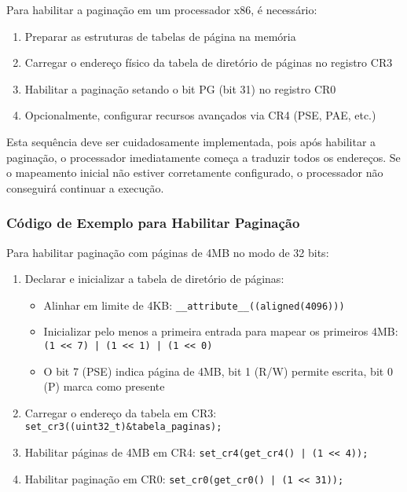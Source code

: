 Para habilitar a paginação em um processador x86, é necessário:

\begin{enumerate}
    \item Preparar as estruturas de tabelas de página na memória
    \item Carregar o endereço físico da tabela de diretório de páginas no registro CR3
    \item Habilitar a paginação setando o bit PG (bit 31) no registro CR0
    \item Opcionalmente, configurar recursos avançados via CR4 (PSE, PAE, etc.)
\end{enumerate}

Esta sequência deve ser cuidadosamente implementada, pois após habilitar a paginação, o processador imediatamente começa a traduzir todos os endereços. Se o mapeamento inicial não estiver corretamente configurado, o processador não conseguirá continuar a execução.

\subsubsection{Código de Exemplo para Habilitar Paginação}

Para habilitar paginação com páginas de 4MB no modo de 32 bits:

\begin{enumerate}
    \item Declarar e inicializar a tabela de diretório de páginas:
    \begin{itemize}
        \item Alinhar em limite de 4KB: \texttt{\_\_attribute\_\_((aligned(4096)))}
        \item Inicializar pelo menos a primeira entrada para mapear os primeiros 4MB: \texttt{(1 << 7) | (1 << 1) | (1 << 0)}
        \item O bit 7 (PSE) indica página de 4MB, bit 1 (R/W) permite escrita, bit 0 (P) marca como presente
    \end{itemize}

    \item Carregar o endereço da tabela em CR3: \texttt{set\_cr3((uint32\_t)\&tabela\_paginas);}

    \item Habilitar páginas de 4MB em CR4: \texttt{set\_cr4(get\_cr4() | (1 << 4));}

    \item Habilitar paginação em CR0: \texttt{set\_cr0(get\_cr0() | (1 << 31));}
\end{enumerate}

